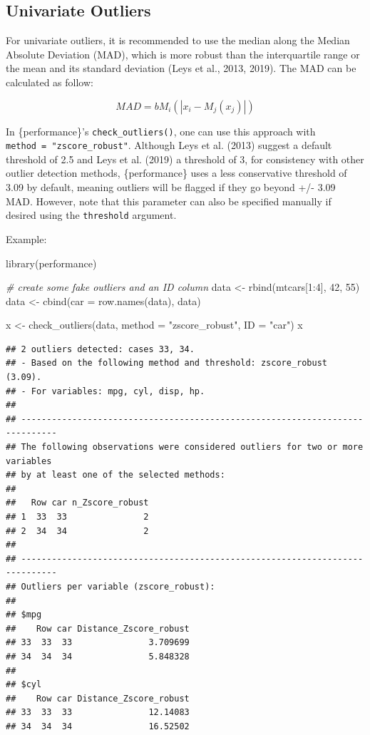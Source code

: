 \documentclass[
]{article}
\newenvironment{Shaded}{\begin{snugshade}}{\end{snugshade}}
\newcommand{\AttributeTok}[1]{\textcolor[rgb]{0.77,0.63,0.00}{#1}}
\newcommand{\CommentTok}[1]{\textcolor[rgb]{0.56,0.35,0.01}{\textit{#1}}}
\newcommand{\DecValTok}[1]{\textcolor[rgb]{0.00,0.00,0.81}{#1}}
\newcommand{\FunctionTok}[1]{\textcolor[rgb]{0.00,0.00,0.00}{#1}}
\newcommand{\NormalTok}[1]{#1}
\newcommand{\OtherTok}[1]{\textcolor[rgb]{0.56,0.35,0.01}{#1}}
\newcommand{\SpecialCharTok}[1]{\textcolor[rgb]{0.00,0.00,0.00}{#1}}
\newcommand{\StringTok}[1]{\textcolor[rgb]{0.31,0.60,0.02}{#1}}
\begin{document}
\hypertarget{univariate-outliers}{%
\subsection{Univariate Outliers}\label{univariate-outliers}}

For univariate outliers, it is recommended to use the median along the
Median Absolute Deviation (MAD), which is more robust than the
interquartile range or the mean and its standard deviation (Leys et al.,
2013, 2019). The MAD can be calculated as follow:

\[
MAD = b M_i(|x_i-M_j(x_j)|)
\]

In \{performance\}'s \texttt{check\_outliers()}, one can use this
approach with \texttt{method\ =\ "zscore\_robust"}. Although Leys et al.
(2013) suggest a default threshold of 2.5 and Leys et al. (2019) a
threshold of 3, for consistency with other outlier detection methods,
\{performance\} uses a less conservative threshold of 3.09 by default,
meaning outliers will be flagged if they go beyond +/- 3.09 MAD.
However, note that this parameter can also be specified manually if
desired using the \texttt{threshold} argument.

Example:

\begin{Shaded}
\begin{Highlighting}[]
\FunctionTok{library}\NormalTok{(performance)}

\CommentTok{\# create some fake outliers and an ID column}
\NormalTok{data }\OtherTok{\textless{}{-}} \FunctionTok{rbind}\NormalTok{(mtcars[}\DecValTok{1}\SpecialCharTok{:}\DecValTok{4}\NormalTok{], }\DecValTok{42}\NormalTok{, }\DecValTok{55}\NormalTok{)}
\NormalTok{data }\OtherTok{\textless{}{-}} \FunctionTok{cbind}\NormalTok{(}\AttributeTok{car =} \FunctionTok{row.names}\NormalTok{(data), data)}

\NormalTok{x }\OtherTok{\textless{}{-}} \FunctionTok{check\_outliers}\NormalTok{(data, }\AttributeTok{method =} \StringTok{"zscore\_robust"}\NormalTok{, }\AttributeTok{ID =} \StringTok{"car"}\NormalTok{)}
\NormalTok{x}
\end{Highlighting}
\end{Shaded}

\begin{verbatim}
## 2 outliers detected: cases 33, 34.
## - Based on the following method and threshold: zscore_robust (3.09).
## - For variables: mpg, cyl, disp, hp.
## 
## -----------------------------------------------------------------------------
## The following observations were considered outliers for two or more variables 
## by at least one of the selected methods: 
## 
##   Row car n_Zscore_robust
## 1  33  33               2
## 2  34  34               2
## 
## -----------------------------------------------------------------------------
## Outliers per variable (zscore_robust): 
## 
## $mpg
##    Row car Distance_Zscore_robust
## 33  33  33               3.709699
## 34  34  34               5.848328
## 
## $cyl
##    Row car Distance_Zscore_robust
## 33  33  33               12.14083
## 34  34  34               16.52502
\end{verbatim}
\end{document}
